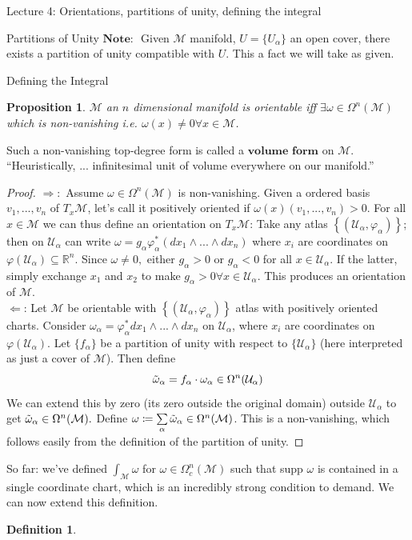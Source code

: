 \documentclass[10pt]{article}
\theoremstyle{plain}
\newtheorem{prop}[thm]{Proposition}
\theoremstyle{definition}
\newtheorem{defn}[thm]{Definition} %
\newcommand{\Note}{\textbf{Note: }}
\newcommand{\Real}{\mathbb{R}}
\newcommand{\man}{\mathcal{M}}
\newcommand{\chartU}{\mathcal{U}}
\newcommand{\chart}{\varphi}
\newcommand{\alphaatlas}{\left\{(\chartU_\alpha,\chart_\alpha)\right\}}
\newcommand{\xman}{x\in\man}
\newcommand{\allthevs}[2]{v_{#1},...,v_{#2}}
\newcommand{\allthewedge}[3]{{#1}_{#2}\wedge...\wedge{#1}_{#3}}
\newcommand{\tang}{T_x\man}
\newcommand{\pformman}[1]{\Omega^{#1}(\man)}
\newcommand{\compactpformman}[1]{\Omega^{#1}_c(\man)}
\newcommand{\dx}{dx}
\newcommand{\sumfromto}[2]{\sum\limits_{#1}^{#2}}
\begin{document}
\begin{section}{Lecture 4: Orientations, partitions of unity, defining the integral}
\begin{subsection}{Partitions of Unity}
  $\Note$ Given $\man$ manifold, $U = \{U_\alpha\}$ an open cover, there exists a partition of unity compatible with $U$. This a fact we will take as given.
 \end{subsection}
\begin{subsection}{Defining the Integral}
\begin{prop}
$\man$ an $n$ dimensional manifold is orientable iff $\exists \omega \in\pformman{n}$ which is non-vanishing i.e. $\omega(x) \neq 0 \forall \xman$. 
\end{prop}\noindent
Such a non-vanishing top-degree form is called a $\textbf{volume form}$ on $\man$. ``Heuristically, ... infinitesimal unit of volume everywhere on our manifold.''
\begin{proof}
$\Rightarrow:$ Assume $\omega\in\pformman{n}$ is non-vanishing. Given a ordered basis $\allthevs{1}{n}$ of $\tang$, let's call it positively oriented if $\omega(x)(\allthevs{1}{n})>0.$ For all $\xman$ we can thus define an orientation on $\tang$: Take any atlas $\alphaatlas$; then on $\chartU_\alpha$ can write $\omega = g_\alpha \chart^*_\alpha ( \allthewedge{\dx}{1}{n})$ where $x_i$ are coordinates on $\chart(\chartU_\alpha)\subseteq \Real^n.$ Since $\omega \neq 0,$ either $g_\alpha > 0$ or $g_\alpha <0$ for all $x \in \chartU _\alpha$. If the latter, simply exchange $x_1$ and $x_2$ to make $g_\alpha>0 \forall x\in\chartU_\alpha$. This produces an orientation of $\man$.\\
$\Leftarrow$: Let $\man$ be orientable with $\alphaatlas$ atlas with positively oriented charts. Consider $\omega_\alpha = \chart^*_\alpha \allthewedge{\dx}{1}{n}$ on $\chartU_\alpha$, where $x_i$ are coordinates on $\chart(\chartU_\alpha).$ Let $\{f_\alpha\}$ be a partition of unity with respect to $\{\chartU_\alpha\}$ (here interpreted as just a cover of $\man$). Then define $$\Tilde{\omega}_\alpha = f_\alpha \cdot \omega_\alpha \in \Omega^n(\chartU_\alpha)$$ We can extend this by zero (its zero outside the original domain) outside $\chartU_\alpha$ to get $\Tilde{\omega}_\alpha \in \pformman{n}.$ Define $\omega \coloneqq \sumfromto{\alpha}{} \Tilde{\omega}_\alpha\in\pformman{n}$. This is a non-vanishing, which follows easily from the definition of the partition of unity.
\end{proof}\noindent
So far: we've defined $\int_\man \omega$ for $\omega \in \compactpformman{n}$ such that supp $\omega$ is contained in a single coordinate chart, which is an incredibly strong condition to demand. We can now extend this definition.
\begin{defn}

\end{defn}
\end{subsection}
\end{section}
\end{document}
